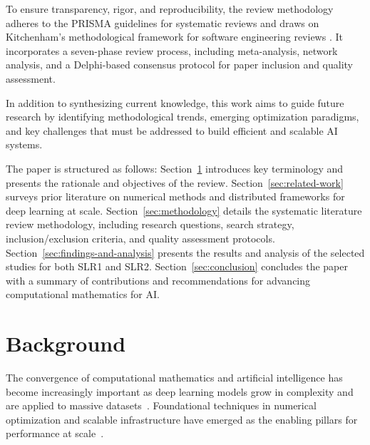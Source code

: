 \documentclass[acmsmall]{acmart}
\begin{document}
To ensure transparency, rigor, and reproducibility, the review methodology adheres to the PRISMA guidelines for 
systematic reviews \citep{moher2009preferred} and draws on Kitchenham's methodological framework for software 
engineering reviews \citep{kitchenham2007guidelines}. It incorporates a seven-phase review process, including meta-analysis, network analysis, 
and a Delphi-based consensus protocol for paper inclusion and quality assessment.

In addition to synthesizing current knowledge, this work aims to guide future research by identifying methodological trends, emerging optimization paradigms, 
and key challenges that must be addressed to build efficient and scalable AI systems.


The paper is structured as follows: Section~\ref{sec:background} introduces key terminology and presents the rationale and objectives of the review. 
Section~\ref{sec:related-work} surveys prior literature on numerical methods and distributed frameworks for deep learning at scale. 
Section~\ref{sec:methodology} details the systematic literature review methodology, including research questions, search strategy, inclusion/exclusion criteria,
 and quality assessment protocols. 
Section~\ref{sec:findings-and-analysis} presents the results and analysis of the selected studies for both SLR1 and SLR2. 
Section~\ref{sec:conclusion} concludes the paper with a summary of contributions and recommendations for advancing computational mathematics for AI.




\section{Background}
\label{sec:background}


The convergence of computational mathematics and artificial intelligence has become increasingly important as deep learning models grow in complexity and are 
applied to massive datasets~\citet{thompson2020computational, najafabadi2015deep}. Foundational techniques in numerical optimization and scalable infrastructure have emerged as the
 enabling pillars for performance at scale~\citet{lecun2015deep,goodfellow2016deep,dean2012large}.
\end{document}
